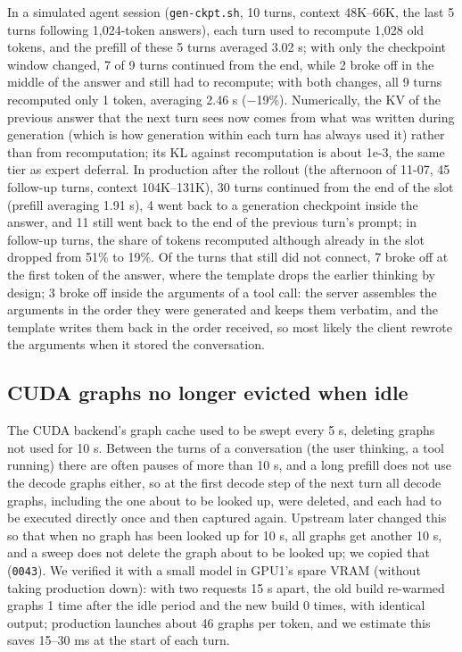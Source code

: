 \documentclass[11pt,a4paper]{article}
\newcommand{\code}[1]{\texttt{#1}}
\begin{document}
In a simulated agent session (\code{gen-ckpt.sh}, 10 turns, context 48K--66K, the last 5 turns following 1,024-token answers), each turn used to recompute 1,028 old tokens, and the prefill of these 5 turns averaged 3.02 s; with only the checkpoint window changed, 7 of 9 turns continued from the end, while 2 broke off in the middle of the answer and still had to recompute; with both changes, all 9 turns recomputed only 1 token, averaging 2.46 s ($-$19\%). Numerically, the KV of the previous answer that the next turn sees now comes from what was written during generation (which is how generation within each turn has always used it) rather than from recomputation; its KL against recomputation is about 1e-3, the same tier as expert deferral. In production after the rollout (the afternoon of 11-07, 45 follow-up turns, context 104K--131K), 30 turns continued from the end of the slot (prefill averaging 1.91 s), 4 went back to a generation checkpoint inside the answer, and 11 still went back to the end of the previous turn's prompt; in follow-up turns, the share of tokens recomputed although already in the slot dropped from 51\% to 19\%. Of the turns that still did not connect, 7 broke off at the first token of the answer, where the template drops the earlier thinking by design; 3 broke off inside the arguments of a tool call: the server assembles the arguments in the order they were generated and keeps them verbatim, and the template writes them back in the order received, so most likely the client rewrote the arguments when it stored the conversation.

\subsection{CUDA graphs no longer evicted when idle}
\label{sec:graphidle}

The CUDA backend's graph cache used to be swept every 5 s, deleting graphs not used for 10 s. Between the turns of a conversation (the user thinking, a tool running) there are often pauses of more than 10 s, and a long prefill does not use the decode graphs either, so at the first decode step of the next turn all decode graphs, including the one about to be looked up, were deleted, and each had to be executed directly once and then captured again. Upstream later changed this so that when no graph has been looked up for 10 s, all graphs get another 10 s, and a sweep does not delete the graph about to be looked up; we copied that (\code{0043}). We verified it with a small model in GPU1's spare VRAM (without taking production down): with two requests 15 s apart, the old build re-warmed graphs 1 time after the idle period and the new build 0 times, with identical output; production launches about 46 graphs per token, and we estimate this saves 15--30 ms at the start of each turn.
\end{document}
